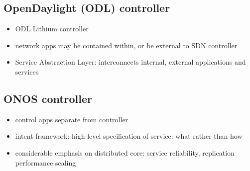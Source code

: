 \subsection{OpenDaylight (ODL) controller}
\begin{itemize}
	\item ODL Lithium controller
	\item network apps may be contained within, or be external to SDN controller
	\item Service Abstraction Layer: interconnects internal, external applications and services
\end{itemize}
\subsection{ONOS controller}
\begin{itemize}
	\item control apps separate from controller
	\item intent framework: high-level specification of service: what rather than how
	\item considerable emphasis on distributed core: service reliability, replication performance scaling
\end{itemize}

